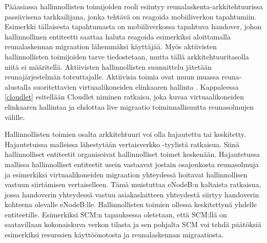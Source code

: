 Pääasiassa hallinnollisten toimijoiden rooli esiintyy reunalaskenta-arkkitehtuurissa passiivisena tarkkailijana, jonka tehtävä on reagoida mobiiliverkon tapahtumiin. 
Esimerkki tällaisesta tapahtumasta on mobiiliverkossa tapahtuva handover, johon hallinnollinen entiteetti saattaa haluta reagoida esimerkiksi aloittamalla reunalaskennan migraation lähemmäksi käyttäjää. 
Myös aktiivisten hallinnollisten toimijoiden tarve tiedostetaan, mutta tällä arkkitehtuuritasolla niitä ei määritellä.
Aktiivisten hallinnollisten suunnittelu jätetään reunajärjestelmän toteuttajalle.
Aktiivisia toimia ovat muun muassa reuna-alustalla suoritettavien virtuaalikoneiden elinkaaren hallinta \cite{yousaf16fine}. Kappaleessa \ref{cloudlet} esitellään Cloudlet niminen ratkaisu, joka kuvaa virtuaalikoneiden elinkaaren hallintaa ja ehdottaa live migraatio toiminnallisuutta reunasolmujen välille.


Hallinnollisten toimien osalta arkkitehtuuri voi olla hajautettu tai keskitetty. 
Hajautetuissa malleissa lähestytään vertaisverkko -tyylistä ratkaisua. Siinä hallinnolliset entiteetit organisoivat hallinnolliset toimet keskenään. Hajautetussa mallissa hallinnolliset entiteetit usein vastaavat jostain osajoukosta reunasolmuja ja esimerkiksi virtuaalikoneiden migraation yhteydessä hoitavat hallinnollisen vastuun siirtämisen vertaiselleen. 
Tämä muistuttaa eNodeB:n kaltaista ratkaisua, jossa handoverin yhteydessä vastuu asiakaslaitteen yhteydestä siirtyy handoverin kohteena olevalle eNodeB:lle. 
Hallinnollisten toimien ollessa keskitettynä yhdelle entiteetille. Esimerkiksi SCM:n \cite{lobillo15scc} tapauksessa oletetaan, että SCM:llä on saatavillaan kokonaiskuva verkon tilasta ja sen pohjalta SCM voi tehdä päätöksiä esimerkiksi resurssien käyttöönotosta ja reunalaskennan migraatiosta. 

